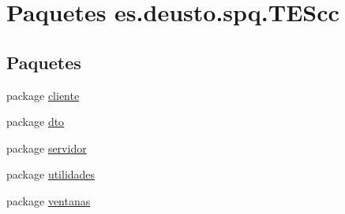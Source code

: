 \hypertarget{namespacees_1_1deusto_1_1spq_1_1_t_e_scc}{\section{Paquetes es.\+deusto.\+spq.\+T\+E\+Scc}
\label{namespacees_1_1deusto_1_1spq_1_1_t_e_scc}
}
\subsection*{Paquetes}
\begin{DoxyCompactItemize}
\item 
package \hyperlink{namespacees_1_1deusto_1_1spq_1_1_t_e_scc_1_1cliente}{cliente}
\item 
package \hyperlink{namespacees_1_1deusto_1_1spq_1_1_t_e_scc_1_1dto}{dto}
\item 
package \hyperlink{namespacees_1_1deusto_1_1spq_1_1_t_e_scc_1_1servidor}{servidor}
\item 
package \hyperlink{namespacees_1_1deusto_1_1spq_1_1_t_e_scc_1_1utilidades}{utilidades}
\item 
package \hyperlink{namespacees_1_1deusto_1_1spq_1_1_t_e_scc_1_1ventanas}{ventanas}
\end{DoxyCompactItemize}
